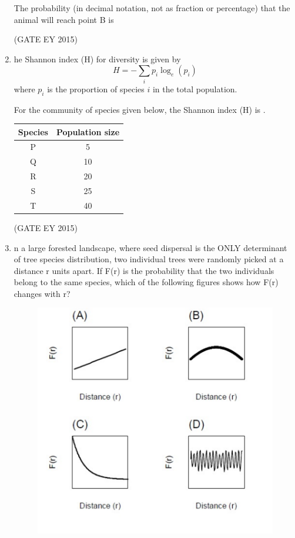 \documentclass[journal,12pt,onecolumn]{IEEEtran}
\theoremstyle{remark}
\begin{document}
\begin{enumerate}
The probability (in decimal notation, not as fraction or percentage) that the animal will reach point B is \underline{\hspace{1.5cm}}

\hfill{(GATE EY 2015)}


\item 

he Shannon index (H) for diversity is given by 
\[
H = - \sum_i p_i \log_e(p_i)
\]
where $p_i$ is the proportion of species $i$ in the total population.

For the community of species given below, the Shannon index (H) is \underline{\hspace{2cm}}.

\begin{center}
\begin{tabular}{|c|c|}
\hline
\textbf{Species} & \textbf{Population size} \\ \hline
P & 5  \\ \hline
Q & 10 \\ \hline
R & 20 \\ \hline
S & 25 \\ \hline
T & 40 \\ \hline
\end{tabular}
\end{center}



    
\hfill{(GATE EY 2015)}



\item 
n a large forested landscape, where seed dispersal is the ONLY determinant of tree species distribution, two individual trees were randomly picked at a distance r units apart. If F(r) is the probability that the two individuals belong to the same species, which of the following figures shows how F(r) changes with r?

\begin{figure}[H]
    \centering
    \includegraphics[]{figs/O.52.png}
    \caption{}
    \label{fig:11}
\end{figure}



\end{enumerate}
\end{document}
